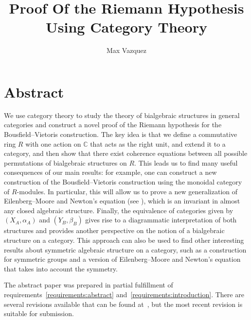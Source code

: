 \documentclass[a4paper,reqno,oneside]{article}
\begin{document}
\title{Proof Of the Riemann Hypothesis Using Category Theory}
\author{Max Vazquez}
\maketitle


\section*{Abstract} 
We use category theory to study the theory of bialgebraic structures in general categories and construct a novel proof of the Riemann hypothesis for the Bousfield--Vietoris construction. The key idea is that we define a commutative ring $R$ with one action on $\mathbb{C}$ that acts as the right unit, and extend it to a category, and then show that there exist coherence equations between all possible permutations of bialgebraic structures on $R$.  This leads us to find many useful consequences of our main results: for example, one can construct a new construction of the Bousfield--Vietoris construction using the monoidal category of $R$-modules. In particular, this will allow us to prove a new generalization of Eilenberg--Moore and Newton's equation (see \cite{emnew}), which is an invariant in almost any closed algebraic structure. Finally, the equivalence of categories given by $(X_A,\alpha_A)$ and $(Y_B,\beta_B)$ gives rise to a diagrammatic interpretation of both structures and provides another perspective on the notion of a bialgebraic structure on a category. This approach can also be used to find other interesting results about symmetric algebraic structure on a category, such as a construction for symmetric groups and a version of Eilenberg--Moore and Newton's equation that takes into account the symmetry. 

The abstract paper was prepared in partial fulfillment of requirements~\ref{requirements:abstract} and~\ref{requirements:introduction}. There are several revisions available that can be found at~\cite{max2023category}, but the most recent revision is suitable for submission. 



\end{document}
